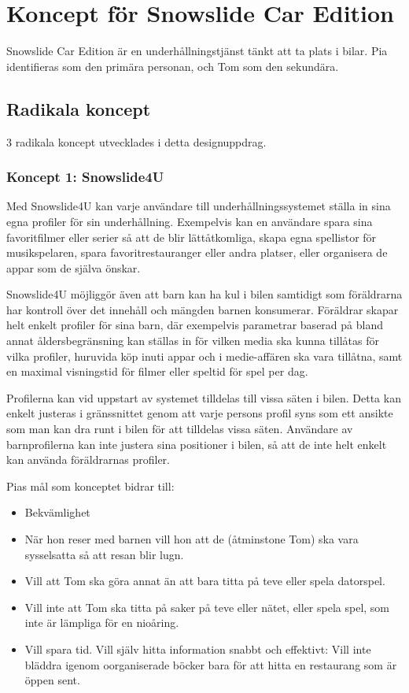 \documentclass[a4paper,12pt,titlepage]{article}
\begin{document}
\section*{Koncept för Snowslide Car Edition}

Snowslide Car Edition är en underhållningstjänst tänkt att ta plats i bilar.
Pia identifieras som den primära personan, och Tom som den sekundära.

\subsection*{Radikala koncept}

3 radikala koncept utvecklades i detta designuppdrag.

\subsubsection*{Koncept 1: Snowslide4U}
Med Snowslide4U kan varje användare till underhållningssystemet ställa in sina
egna profiler för sin underhållning. Exempelvis kan en användare spara sina
favoritfilmer eller serier så att de blir lättåtkomliga, skapa egna
spellistor för musikspelaren, spara favoritrestauranger eller andra platser,
eller organisera de appar som de själva önskar.

Snowslide4U möjliggör även att barn kan ha kul i bilen samtidigt som föräldrarna
har kontroll över det innehåll och mängden barnen konsumerar.
Föräldrar skapar helt enkelt profiler för sina barn,
där exempelvis parametrar baserad på bland annat åldersbegränsning kan ställas in
för vilken media ska kunna tillåtas för vilka profiler, huruvida köp inuti
appar och i medie-affären ska vara tillåtna, samt en maximal visningstid för
filmer eller speltid för spel per dag.

Profilerna kan vid uppstart av systemet tilldelas till vissa säten i bilen.
Detta kan enkelt justeras i gränssnittet genom att varje persons profil syns som
ett ansikte som man kan dra runt i bilen för att tilldelas vissa säten.
Användare av barnprofilerna kan inte justera sina positioner i bilen, så att de inte helt
enkelt kan använda föräldrarnas profiler.

Pias mål som konceptet bidrar till:
\begin{itemize}
    \item Bekvämlighet
    \item När hon reser med barnen vill
        hon att de (åtminstone Tom) ska vara
        sysselsatta så att resan blir lugn.
    \item Vill att Tom ska göra annat än att
        bara titta på teve eller spela datorspel.
    \item Vill inte att Tom ska titta på saker
        på teve eller nätet, eller spela spel,
        som inte är lämpliga för en nioåring.
    \item Vill spara tid. Vill själv hitta
        information snabbt och effektivt: Vill
        inte bläddra igenom oorganiserade
        böcker bara för att hitta en restaurang
        som är öppen sent.
\end{itemize}
\end{document}
